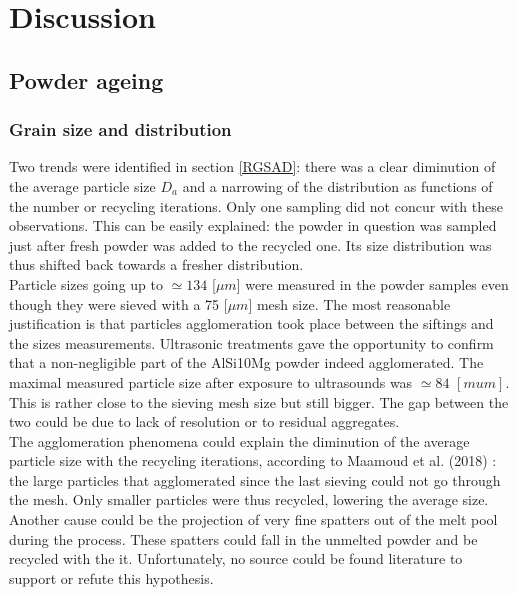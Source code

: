 \chapter{Discussion}
\label{Chap5}
\section{Powder ageing}
\subsection{Grain size and distribution}

Two trends were identified in section \ref{RGSAD}: there was a clear diminution of the average particle size $D_a$ and a narrowing of the distribution as functions of the number or recycling iterations. Only one sampling did not concur with these observations. This can be easily explained: the powder in question was sampled just after fresh powder was added to the recycled one. Its size distribution was thus shifted back towards a fresher distribution. \\

Particle sizes going up to $\simeq 134$ [$\mu m$] were measured in the powder samples even though they were sieved with a 75 [$\mu m$] mesh size. The most reasonable justification is that particles agglomeration took place between the siftings and the sizes measurements. Ultrasonic treatments gave the opportunity to confirm that a non-negligible part of the AlSi10Mg powder indeed agglomerated. The maximal measured particle size after exposure to ultrasounds was $\simeq 84$ $[mu m]$. This is rather close to the sieving mesh size but still bigger. The gap between the two could be due to lack of resolution or to residual aggregates.\\

The agglomeration phenomena could explain the diminution of the average particle size with the recycling iterations, according to Maamoud et al. (2018) \cite{Maamoud18}: the large particles that agglomerated since the last sieving could not go through the mesh. Only smaller particles were thus recycled, lowering the average size. Another cause could be the projection of very fine spatters out of the melt pool during the process. These spatters could fall in the unmelted powder and be recycled with the it. Unfortunately, no source could be found literature to support or refute this hypothesis.\\

